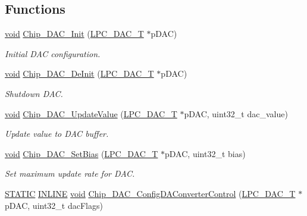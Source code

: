 \subsection*{Functions}
\begin{DoxyCompactItemize}
\item 
\hyperlink{Paradigm_2Tern__EE_2small_2portmacro_8h_a14d32f8130d3c0b212cfc751730b5b49}{void} \hyperlink{group__DAC__17XX__40XX_ga677c6f03e4ea92656c4cb3497fbb4a1b}{Chip\-\_\-\-D\-A\-C\-\_\-\-Init} (\hyperlink{structLPC__DAC__T}{L\-P\-C\-\_\-\-D\-A\-C\-\_\-\-T} $\ast$p\-D\-A\-C)
\begin{DoxyCompactList}\small\item\em Initial D\-A\-C configuration. \end{DoxyCompactList}\item 
\hyperlink{Paradigm_2Tern__EE_2small_2portmacro_8h_a14d32f8130d3c0b212cfc751730b5b49}{void} \hyperlink{group__DAC__17XX__40XX_gabc7ee03f31b9085f6e77137e7ed1158d}{Chip\-\_\-\-D\-A\-C\-\_\-\-De\-Init} (\hyperlink{structLPC__DAC__T}{L\-P\-C\-\_\-\-D\-A\-C\-\_\-\-T} $\ast$p\-D\-A\-C)
\begin{DoxyCompactList}\small\item\em Shutdown D\-A\-C. \end{DoxyCompactList}\item 
\hyperlink{Paradigm_2Tern__EE_2small_2portmacro_8h_a14d32f8130d3c0b212cfc751730b5b49}{void} \hyperlink{group__DAC__17XX__40XX_ga8fa415039ac2f63388ff12cf43cc45bf}{Chip\-\_\-\-D\-A\-C\-\_\-\-Update\-Value} (\hyperlink{structLPC__DAC__T}{L\-P\-C\-\_\-\-D\-A\-C\-\_\-\-T} $\ast$p\-D\-A\-C, uint32\-\_\-t dac\-\_\-value)
\begin{DoxyCompactList}\small\item\em Update value to D\-A\-C buffer. \end{DoxyCompactList}\item 
\hyperlink{Paradigm_2Tern__EE_2small_2portmacro_8h_a14d32f8130d3c0b212cfc751730b5b49}{void} \hyperlink{group__DAC__17XX__40XX_ga01352564a69b1286d45a65cf06a246f2}{Chip\-\_\-\-D\-A\-C\-\_\-\-Set\-Bias} (\hyperlink{structLPC__DAC__T}{L\-P\-C\-\_\-\-D\-A\-C\-\_\-\-T} $\ast$p\-D\-A\-C, uint32\-\_\-t bias)
\begin{DoxyCompactList}\small\item\em Set maximum update rate for D\-A\-C. \end{DoxyCompactList}\item 
\hyperlink{group__LPC__Types__Public__Macros_ga10b2d890d871e1489bb02b7e70d9bdfb}{S\-T\-A\-T\-I\-C} \hyperlink{group__LPC__Types__Public__Types_ga2eb6f9e0395b47b8d5e3eeae4fe0c116}{I\-N\-L\-I\-N\-E} \hyperlink{Paradigm_2Tern__EE_2small_2portmacro_8h_a14d32f8130d3c0b212cfc751730b5b49}{void} \hyperlink{group__DAC__17XX__40XX_gadd2150c87e3fc28f301417f34a5eb287}{Chip\-\_\-\-D\-A\-C\-\_\-\-Config\-D\-A\-Converter\-Control} (\hyperlink{structLPC__DAC__T}{L\-P\-C\-\_\-\-D\-A\-C\-\_\-\-T} $\ast$p\-D\-A\-C, uint32\-\_\-t dac\-Flags)

\end{DoxyCompactItemize}
